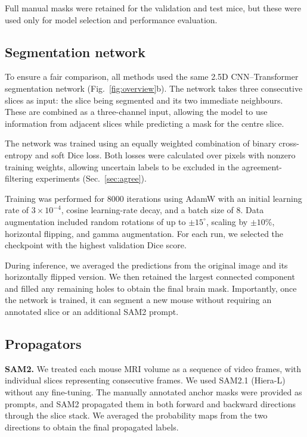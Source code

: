\documentclass{article}
\begin{document}
Full manual masks were retained for the validation and test mice, but these were used only for model selection and performance evaluation.

\subsection{Segmentation network}

To ensure a fair comparison, all methods used the same 2.5D CNN--Transformer segmentation network (Fig.~\ref{fig:overview}b). The network takes three consecutive slices as input: the slice being segmented and its two immediate neighbours. These are combined as a three-channel input, allowing the model to use information from adjacent slices while predicting a mask for the centre slice.

The network was trained using an equally weighted combination of binary cross-entropy and soft Dice loss. Both losses were calculated over pixels with nonzero training weights, allowing uncertain labels to be excluded in the agreement-filtering experiments (Sec.~\ref{sec:agree}).

Training was performed for 8000 iterations using AdamW with an initial learning rate of $3\times10^{-4}$, cosine learning-rate decay, and a batch size of 8. Data augmentation included random rotations of up to $\pm15^\circ$, scaling by $\pm10\%$, horizontal flipping, and gamma augmentation. For each run, we selected the checkpoint with the highest validation Dice score.

During inference, we averaged the predictions from the original image and its horizontally flipped version. We then retained the largest connected component and filled any remaining holes to obtain the final brain mask. Importantly, once the network is trained, it can segment a new mouse without requiring an annotated slice or an additional SAM2 prompt.

\subsection{Propagators}
\label{sec:prop}

\textbf{SAM2.}
We treated each mouse MRI volume as a sequence of video frames, with individual slices representing consecutive frames. We used SAM2.1 (Hiera-L) \cite{ravi2024sam2} without any fine-tuning. The manually annotated anchor masks were provided as prompts, and SAM2 propagated them in both forward and backward directions through the slice stack. We averaged the probability maps from the two directions to obtain the final propagated labels.
\end{document}
